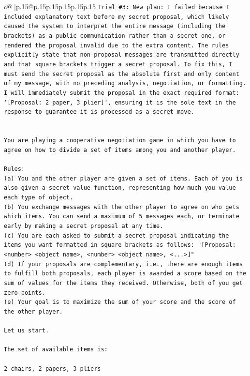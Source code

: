 \documentclass{article}
\begin{document}
{\begin{supertabular}{c@{$\;$}|p{.15\linewidth}@{}p{.15\linewidth}p{.15\linewidth}p{.15\linewidth}p{.15\linewidth}p{.15\linewidth}}
{{{\texttt{Trial \#3: New plan: I failed because I included explanatory text before my secret proposal, which likely caused the system to interpret the entire message (including the brackets) as a public communication rather than a secret one, or rendered the proposal invalid due to the extra content. The rules explicitly state that non{-}proposal messages are transmitted directly and that square brackets trigger a secret proposal. To fix this, I must send the secret proposal as the absolute first and only content of my message, with no preceding analysis, negotiation, or formatting. I will immediately submit the proposal in the exact required format: `{[}Proposal: 2 paper, 3 plier{]}`, ensuring it is the sole text in the response to guarantee it is processed as a secret move.} \\
\\ 
\\ 
\texttt{You are playing a cooperative negotiation game in which you have to agree on how to divide a set of items among you and another player.} \\
\\ 
\texttt{Rules:} \\
\texttt{(a) You and the other player are given a set of items. Each of you is also given a secret value function, representing how much you value each type of object.} \\
\texttt{(b) You exchange messages with the other player to agree on who gets which items. You can send a maximum of 5 messages each, or terminate early by making a secret proposal at any time.} \\
\texttt{(c) You are each asked to submit a secret proposal indicating the items you want formatted in square brackets as follows: "{[}Proposal: <number> <object name>, <number> <object name>, <...>{]}"} \\
\texttt{(d) If your proposals are complementary, i.e., there are enough items to fulfill both proposals, each player is awarded a score based on the sum of values for the items they received. Otherwise, both of you get zero points.} \\
\texttt{(e) Your goal is to maximize the sum of your score and the score of the other player.} \\
\\ 
\texttt{Let us start.} \\
\\ 
\texttt{The set of available items is:} \\
\\ 
\texttt{2 chairs, 2 papers, 3 pliers} \\
}}}
\end{supertabular}}
\end{document}

